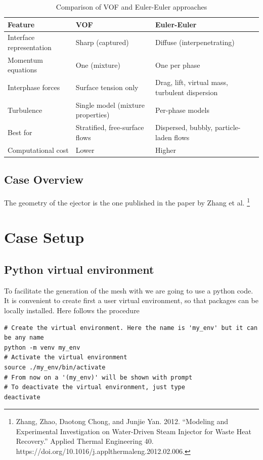 \documentclass[
    parskip=half,      %
    DIV=12,            %
    headings=normal,   %
    fontsize=11pt,     %
    english            %
]{scrartcl}
\begin{document}
\begin{table}[H]
	\centering
	\caption{Comparison of VOF and Euler-Euler approaches}
	\label{tab:vof_euler_comparison}
	\begin{tabular}{|p{4cm}|p{4cm}|p{4cm}|}
		\hline
		\textbf{Feature} & \textbf{VOF} & \textbf{Euler-Euler} \\
		\hline
		Interface representation & Sharp (captured) & Diffuse (interpenetrating) \\
		\hline
		Momentum equations & One (mixture) & One per phase \\
		\hline
		Interphase forces & Surface tension only & Drag, lift, virtual mass, turbulent dispersion \\
		\hline
		Turbulence & Single model (mixture properties) & Per-phase models \\
		\hline
		Best for & Stratified, free-surface flows & Dispersed, bubbly, particle-laden flows \\
		\hline
		Computational cost & Lower & Higher \\
		\hline
	\end{tabular}
\end{table}
\subsection{Case Overview}

The geometry of the ejector is the one published in the paper by Zhang et al. \footnote{Zhang, Zhao, Daotong Chong, and Junjie Yan. 2012. “Modeling and Experimental Investigation on Water-Driven Steam Injector for Waste Heat Recovery.” Applied Thermal Engineering 40. https://doi.org/10.1016/j.applthermaleng.2012.02.006.}


\section{Case Setup}

\subsection{Python virtual environment}

To facilitate the generation of the mesh with  we are going to 
use a python code. It is convenient to create first a user virtual environment, so
that packages can be locally installed. Here follows the procedure

\begin{lstlisting}[style=terminal]
# Create the virtual environment. Here the name is 'my_env' but it can be any name
python -m venv my_env
# Activate the virtual environment
source ./my_env/bin/activate
# From now on a '(my_env)' will be shown with prompt
# To deactivate the virtual environment, just type
deactivate 
\end{lstlisting}
\end{document}
